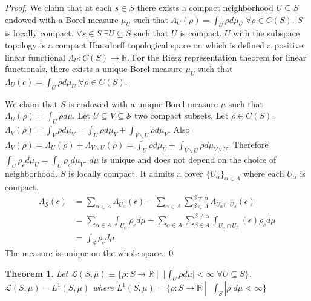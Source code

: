 \documentclass[smallextended]{svjour3}
\numberwithin{equation}{section}
\renewenvironment{proof}{\emph{Proof}.}{\hfill\(\qed\)}
\newtheorem{thrm}[equation]{Theorem}
\theoremstyle{definition}
\renewenvironment{proof}{\emph{Proof}.}{\qed}
\newcommand{\journal}[1]{\ifjournal#1\fi}
\begin{document}
\begin{proof}
	We claim that at each $s \in S$ there exists a compact neighborhood $U \subseteq S$ endowed with a Borel measure $\mu_U$ such that $\Lambda_U (\rho) = \int_U \rho d \mu_U \; \forall \rho \in C(S)$. $S$ is locally compact. $\forall s \in S \; \exists U \subseteq S$ such that $U$ is compact. $U$ with the subspace topology is a compact Hausdorff topological space on which is defined a positive linear functional $\Lambda_U : C(S) \rightarrow \mathbb{R}$. For the Riesz representation theorem for linear functionals, there exists a unique Borel measure $\mu_U$ such that $\Lambda_U (\mathcal{c}) = \int_U \rho d \mu_U \; \forall \rho \in C(S)$.
	
	We claim that $S$ is endowed with a unique Borel measure $\mu$ such that $\Lambda_U (\rho) = \int_U \rho d \mu$. Let $U \subseteq V \subseteq \mathcal{S}$ two compact subsets. Let $\rho \in C(S)$. $\Lambda_V (\rho) = \int_V \rho d \mu_V = \int_U \rho d \mu_V + \int_{V\backslash U} \rho d \mu_V$. Also $\Lambda_V (\rho) = \Lambda_U (\rho) + \Lambda_{V\backslash U} (\rho) = \int_U \rho d \mu_U + \int_{V \backslash U} \rho d \mu_{\overline{V \backslash U}} $. Therefore\journal{\break} $\int_{U} \rho_{\mathcal{c}} d \mu_U = \int_{U} \rho_{\mathcal{c}} d \mu_V$. $d\mu$ is unique and does not depend on the choice of neighborhood. $S$ is locally compact. It admits a cover $\{U_\alpha\}_{\alpha \in A}$ where each $U_\alpha$ is compact.
	\begin{align*}
	\Lambda_{\mathcal{S}}(\mathcal{c}) &= \sum \limits_{\alpha \in A} \Lambda_{U_\alpha}(\mathcal{c}) - \sum \limits_{\alpha \in A} \sum \limits_{\beta \in A}^{\beta \neq\alpha} \Lambda_{U_\alpha \cap U_\beta}(\mathcal{c}) \\
	&= \sum \limits_{\alpha \in A} \int_{U_\alpha} \rho_{\mathcal{c}} d\mu - \sum \limits_{\alpha \in A} \sum \limits_{\beta \in A}^{\beta \neq\alpha} \int_{U_\alpha \cap U_\beta}(\mathcal{c}) \rho_{\mathcal{c}} d\mu \\
	&= \int_{\mathcal{S}} \rho_{\mathcal{c}} d\mu
	\end{align*}
	The measure is unique on the whole space.
\end{proof}

\begin{thrm}\label{everywhere_integrable_is_lebesgue_integrable}
	Let $\mathcal{L}(S,\mu) \equiv \{ \rho : S \rightarrow \mathbb{R} \; | \;\; |\int_{U} \rho d\mu| < \infty \; \forall U \subseteq S\}$. $\mathcal{L}(S,\mu)=L^1(S,\mu)$ where $L^1(S,\mu) = \{ \rho : S \rightarrow \mathbb{R} \; | \;\; \int_{S} |\rho| d\mu < \infty \}$
\end{thrm}
\end{document}

